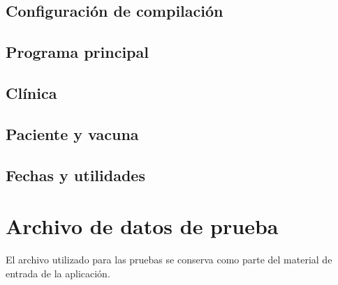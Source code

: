 \documentclass[12pt,letterpaper]{article}
\begin{document}
\subsection{Configuración de compilación}


\subsection{Programa principal}


\subsection{Clínica}



\subsection{Paciente y vacuna}





\subsection{Fechas y utilidades}





\section{Archivo de datos de prueba}
\label{app:datos}

El archivo utilizado para las pruebas se conserva como parte del material de
entrada de la aplicación.


\end{document}

